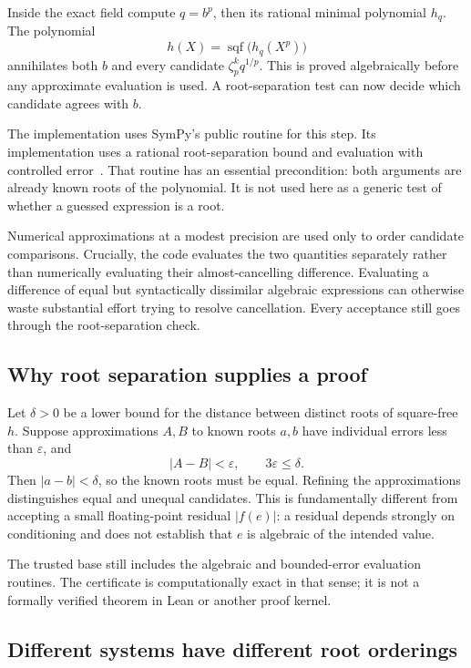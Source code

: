 \documentclass[11pt,a4paper]{article}
\newcommand{\code}[1]{\texttt{\detokenize{#1}}}
\theoremstyle{definition}
\theoremstyle{remark}
\begin{document}
Inside the exact field compute $q=b^p$, then its rational minimal polynomial $h_q$. The polynomial
\begin{equation}
 h(X)=\operatorname{sqf}\bigl(h_q(X^p)\bigr)
 \label{eq:branchannihilator}
\end{equation}
annihilates both $b$ and every candidate $\zeta_p^k q^{1/p}$. This is proved algebraically before any approximate evaluation is used. A root-separation test can now decide which candidate agrees with $b$.

The implementation uses SymPy's public \code{Poly.same_root} routine for this step. Its implementation uses a rational root-separation bound and evaluation with controlled error~\cite{sympyreference}. That routine has an essential precondition: both arguments are already known roots of the polynomial. It is not used here as a generic test of whether a guessed expression is a root.

Numerical approximations at a modest precision are used only to order candidate comparisons. Crucially, the code evaluates the two quantities separately rather than numerically evaluating their almost-cancelling difference. Evaluating a difference of equal but syntactically dissimilar algebraic expressions can otherwise waste substantial effort trying to resolve cancellation. Every acceptance still goes through the root-separation check.

\subsection{Why root separation supplies a proof}

Let $\delta>0$ be a lower bound for the distance between distinct roots of square-free $h$. Suppose approximations $A,B$ to known roots $a,b$ have individual errors less than $\varepsilon$, and
\[
 |A-B|<\varepsilon,\qquad 3\varepsilon\le\delta.
\]
Then $|a-b|<\delta$, so the known roots must be equal. Refining the approximations distinguishes equal and unequal candidates. This is fundamentally different from accepting a small floating-point residual $|f(e)|$: a residual depends strongly on conditioning and does not establish that $e$ is algebraic of the intended value.

The trusted base still includes the algebraic and bounded-error evaluation routines. The certificate is computationally exact in that sense; it is not a formally verified theorem in Lean or another proof kernel.

\subsection{Different systems have different root orderings}
\end{document}
